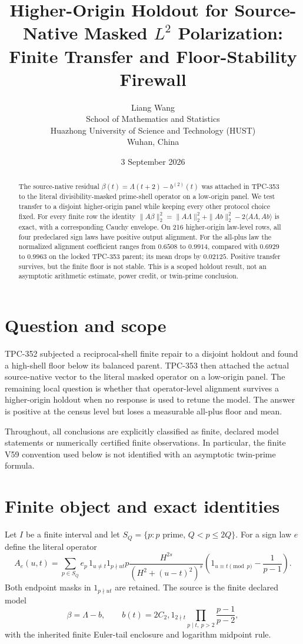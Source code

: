\documentclass[10pt]{article}
\title{Higher-Origin Holdout for Source-Native Masked $L^2$ Polarization:\\
Finite Transfer and Floor-Stability Firewall}
\author{Liang Wang\\
School of Mathematics and Statistics\\
Huazhong University of Science and Technology (HUST)\\
Wuhan, China}
\date{3 September 2026}
\begin{document}
\maketitle

\begin{abstract}
The source-native residual $\beta(t)=\Lambda(t+2)-b^{(2)}(t)$ was attached in
TPC-353 to the literal divisibility-masked prime-shell operator on a low-origin
panel.  We test transfer to a disjoint higher-origin panel while keeping every
other protocol choice fixed.  For every finite row the identity
$\|A\beta\|_2^2=\|A\Lambda\|_2^2+\|Ab\|_2^2-2\langle A\Lambda,Ab\rangle$
is exact, with a corresponding Cauchy envelope.  On 216 higher-origin
law-level rows, all four predeclared sign laws have positive output alignment.
For the all-plus law the normalized alignment coefficient ranges from
$0.6508$ to $0.9914$, compared with $0.6929$ to $0.9963$ on the locked TPC-353
parent; its mean drops by $0.02125$.  Positive transfer survives, but the
finite floor is not stable.  This is a scoped holdout result, not an
asymptotic arithmetic estimate, power credit, or twin-prime conclusion.
\end{abstract}

\section{Question and scope}

TPC-352 subjected a reciprocal-shell finite repair to a disjoint holdout and
found a high-shell floor below its balanced parent.  TPC-353 then attached the
actual source-native vector to the literal masked operator on a low-origin
panel.  The remaining local question is whether that operator-level alignment
survives a higher-origin holdout when no response is used to retune the model.
The answer is positive at the census level but loses a measurable all-plus
floor and mean.

Throughout, all conclusions are explicitly classified as finite, declared
model statements or numerically certified finite observations.  In particular,
the finite V59 convention used below is not identified with an asymptotic
twin-prime formula.

\section{Finite object and exact identities}

Let $I$ be a finite interval and let $S_Q=\{p: p$ prime, $Q<p\leq 2Q\}$.
For a sign law $e$ define the literal operator
\begin{equation}
 A_e(u,t)=\sum_{p\in S_Q}e_p\,1_{u\ne t}1_{p\nmid ut}
 p\frac{H^{2s}}{(H^2+(u-t)^2)^s}
 \left(1_{u\equiv t\pmod p}-\frac1{p-1}\right).
 \label{eq:operator}
\end{equation}
Both endpoint masks in $1_{p\nmid ut}$ are retained.  The source is the
finite declared model
\begin{equation}
 \beta=\Lambda-b,\qquad
 b(t)=2C_2,1_{2\nmid t}\prod_{p\mid t,\ p>2}\frac{p-1}{p-2},
 \label{eq:source}
\end{equation}
with the inherited finite Euler-tail enclosure and logarithm midpoint rule.
\end{document}
